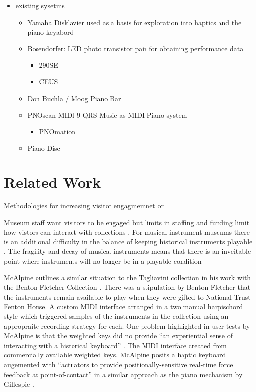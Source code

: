 \begin{itemize}
\item
  existing sysetms

  \begin{itemize}
  \item
    Yamaha Disklavier used as a basis for exploration into haptics and
    the piano keyabord
    \cite{MusicalHaptics2018_04, MusicalHaptics2018_05,
    MusicalHaptics2018_13}
  \item
    Bosendorfer: LED photo transistor pair \cite{Moog1990} for obtaining
    performance data \cite{MusicalHaptics2018_05}

    \begin{itemize}
    \item
      290SE
    \item
      CEUS
    \end{itemize}
  \item
    Don Buchla / Moog Piano Bar
  \item
    PNOscan MIDI 9 QRS Music as MIDI Piano system \cite{McPherson2013}

    \begin{itemize}
    \item
      PNOmation
    \end{itemize}
  \item
    Piano Disc
  \end{itemize}
\end{itemize}

\section{Related Work}\label{related-work}

Methodologies for increasing visitor engagmemnet or

Museum staff want visitors to be engaged but limits in staffing and
funding limit how vistors can interact with collections
\cite{Templeton2018,
McAlpine2014}. For musical instrument museums there is an additional
difficulty in the balance of keeping historical instruments playable
\cite{McAlpine2014}. The fragility and decay of musical instruments
means that there is an inveitable point where instruments will no longer
be in a playable condition \cite{McAlpine2014, Fritz2017}

McAlpine outlines a similar situation to the Tagliavini collection in
his work with the Benton Fletcher Collection \cite{McAlpine2014}. There
was a stipulation by Benton Fletcher that the instruments remain
available to play when they were gifted to National Trust Fenton House.
A custom MIDI interface arranged in a two manual harpischord style which
triggered samples of the instruments in the collection using an
appropraite recording strategy for each. One problem highlighted in user
tests by McAlpine is that the weighted keys did no provide ``an
experiential sense of interacting with a historical keyboard''
\cite{McAlpine2014}. The MIDI interface created from commercially
available weighted keys. McAlpine posits a haptic keyboard augemented
with ``actuators to provide positionally-sensitive real-time force
feedback at point-of-contact'' in a similar approach as the piano
mechanism by Gillespie \cite{Gillespie1996}.

